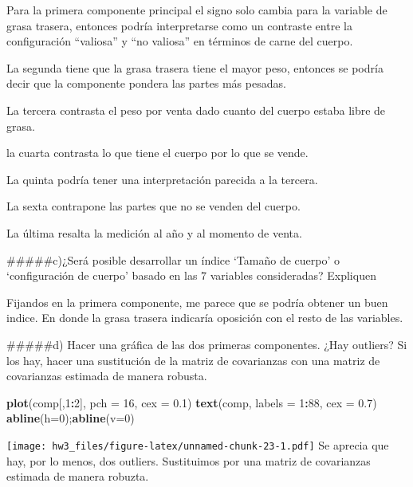 \documentclass[]{article}
\newenvironment{Shaded}{\begin{snugshade}}{\end{snugshade}}
\newcommand{\DataTypeTok}[1]{\textcolor[rgb]{0.13,0.29,0.53}{#1}}
\newcommand{\DecValTok}[1]{\textcolor[rgb]{0.00,0.00,0.81}{#1}}
\newcommand{\FloatTok}[1]{\textcolor[rgb]{0.00,0.00,0.81}{#1}}
\newcommand{\KeywordTok}[1]{\textcolor[rgb]{0.13,0.29,0.53}{\textbf{#1}}}
\newcommand{\NormalTok}[1]{#1}
\newcommand{\OperatorTok}[1]{\textcolor[rgb]{0.81,0.36,0.00}{\textbf{#1}}}
\begin{document}
Para la primera componente principal el signo solo cambia para la
variable de grasa trasera, entonces podría interpretarse como un
contraste entre la configuración ``valiosa'' y ``no valiosa'' en
términos de carne del cuerpo.

La segunda tiene que la grasa trasera tiene el mayor peso, entonces se
podría decir que la componente pondera las partes más pesadas.

La tercera contrasta el peso por venta dado cuanto del cuerpo estaba
libre de grasa.

la cuarta contrasta lo que tiene el cuerpo por lo que se vende.

La quinta podría tener una interpretación parecida a la tercera.

La sexta contrapone las partes que no se venden del cuerpo.

La última resalta la medición al año y al momento de venta.

\#\#\#\#\#c)¿Será posible desarrollar un índice `Tamaño de cuerpo' o
`configuración de cuerpo' basado en las 7 variables consideradas?
Expliquen

Fijandos en la primera componente, me parece que se podría obtener un
buen indice. En donde la grasa trasera indicaría oposición con el resto
de las variables.

\#\#\#\#\#d) Hacer una gráfica de las dos primeras componentes. ¿Hay
outliers? Si los hay, hacer una sustitución de la matriz de covarianzas
con una matriz de covarianzas estimada de manera robusta.

\begin{Shaded}
\begin{Highlighting}[]
\KeywordTok{plot}\NormalTok{(comp[,}\DecValTok{1}\OperatorTok{:}\DecValTok{2}\NormalTok{], }\DataTypeTok{pch =} \DecValTok{16}\NormalTok{, }\DataTypeTok{cex =} \FloatTok{0.1}\NormalTok{)}
\KeywordTok{text}\NormalTok{(comp, }\DataTypeTok{labels =} \DecValTok{1}\OperatorTok{:}\DecValTok{88}\NormalTok{, }\DataTypeTok{cex =} \FloatTok{0.7}\NormalTok{) }
\KeywordTok{abline}\NormalTok{(}\DataTypeTok{h=}\DecValTok{0}\NormalTok{);}\KeywordTok{abline}\NormalTok{(}\DataTypeTok{v=}\DecValTok{0}\NormalTok{)}
\end{Highlighting}
\end{Shaded}

\texttt{[image: hw3\_files/figure-latex/unnamed-chunk-23-1.pdf]} Se
aprecia que hay, por lo menos, dos outliers. Sustituimos por una matriz
de covarianzas estimada de manera robuzta.
\end{document}
